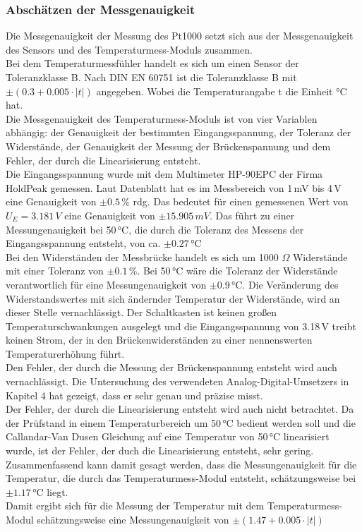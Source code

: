 \newpage
\subsubsection{Abschätzen der Messgenauigkeit}
Die Messgenauigkeit der Messung des Pt1000 setzt sich aus der Messgenauigkeit des Sensors und des Temperaturmess-Moduls zusammen.
\\
Bei dem Temperaturmessfühler handelt es sich um einen Sensor der Toleranzklasse B. Nach DIN EN 60751 ist die Toleranzklasse B mit \(\pm (0.3 + 0.005 \cdot |t|)\) angegeben. Wobei die Temperaturangabe t die Einheit °C hat.
\cite{W06_datasheet}
\\
Die Messgenauigkeit des Temperaturmess-Moduls ist von vier Variablen abhängig: der Genauigkeit der bestimmten Eingangsspannung, der Toleranz der Widerstände, der Genauigkeit der Messung der Brückenspannung und dem Fehler, der durch die Linearisierung entsteht.
\\
Die Eingangsspannung wurde mit dem Multimeter HP-90EPC der Firma HoldPeak gemessen. Laut Datenblatt hat es im Messbereich von 1\,mV bis 4\,V eine Genauigkeit von \(\pm 0.5\)\,\% rdg. Das bedeutet für einen gemessenen Wert von \(U_E = 3.181\,V\) eine Genauigkeit von \(\pm 15.905\,mV\). Das führt zu einer Messungenauigkeit bei 50\,°C, die durch die Toleranz des Messens der Eingangsspannung entsteht, von ca. \(\pm0.27\)\,°C
\cite{HP-90EPC_datasheet}
\\
Bei den Widerständen der Messbrücke handelt es sich um 1000 \(\Omega\) Widerstände mit einer Toleranz von \(\pm 0.1\)\,\%. Bei 50\,°C wäre die Toleranz der Widerstände verantwortlich für eine Messungenauigkeit von \(\pm 0.9\)\,°C. Die Veränderung des Widerstandswertes mit sich ändernder Temperatur der Widerstände, wird an dieser Stelle vernachlässigt. Der Schaltkasten ist keinen großen Temperaturschwankungen ausgelegt und die Eingangsspannung von 3.18\,V treibt keinen Strom, der in den Brückenwiderständen zu einer nennenswerten Temperaturerhöhung führt.
\\
Den Fehler, der durch die Messung der Brückenspannung entsteht wird auch vernachlässigt. Die Untersuchung des verwendeten Analog-Digital-Umsetzers in Kapitel 4 hat gezeigt, dass er sehr genau und präzise misst.
\\
Der Fehler, der durch die Linearisierung entsteht wird auch nicht betrachtet. Da der Prüfstand in einem Temperaturbereich um 50\,°C bedient werden soll und die Callandar-Van Dusen Gleichung auf eine Temperatur von 50\,°C linearisiert wurde, ist der Fehler, der duch die Linearisierung entsteht, sehr gering.
\\
Zusammenfassend kann damit gesagt werden, dass die Messungenauigkeit für die Temperatur, die durch das Temperaturmess-Modul entsteht, schätzungsweise bei \(\pm 1.17\)\,°C liegt.
\\
Damit ergibt sich für die Messung der Temperatur mit dem Temperaturmess-Modul schätzungsweise eine Messungenauigkeit von \(\pm (1.47 + 0.005 \cdot |t|)\)

